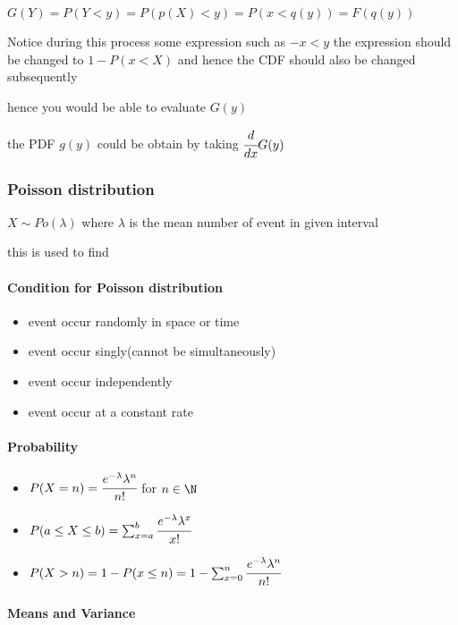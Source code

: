 \documentclass[]{article}
\let\oldparagraph\paragraph
\renewcommand{\paragraph}[1]{\oldparagraph{#1}\mbox{}}
\begin{document}
\(G(Y) = P(Y<y) = P(p(X)<y) = P(x<q(y)) = F(q(y))\)

Notice during this process some expression such as \(-x<y\) the
expression should be changed to \(1-P(x<X)\) and hence the CDF should
also be changed subsequently

hence you would be able to evaluate \(G(y)\)

the PDF \(g(y)\) could be obtain by taking \(\cfrac{d}{dx} G(y)\)

\subsubsection{Poisson distribution}\label{header-n43}

\(X\sim Po(\lambda)\) where \(\lambda\) is the mean number of event in
given interval

this is used to find

\paragraph{Condition for Poisson distribution}\label{header-n46}

\begin{itemize}
\item
  event occur randomly in space or time
\item
  event occur singly(cannot be simultaneously)
\item
  event occur independently
\item
  event occur at a constant rate
\end{itemize}

\paragraph{Probability}\label{header-n56}

\begin{itemize}
\item
  \( P(X = n) = \cfrac{e^{-\lambda} \lambda^n}{n!}\) for \(n \in \N\)
\item
  \(P(a \le X \le b) = \sum^b_{x = a}\cfrac{e^{-\lambda} \lambda^x}{x!}\)
\item
  \(P(X>n) = 1-P(x\le n) = 1-\sum^n_{x=0}\cfrac{e^{-\lambda} \lambda^n}{n!} \)
\end{itemize}

\paragraph{Means and Variance}\label{header-n64}
\end{document}
